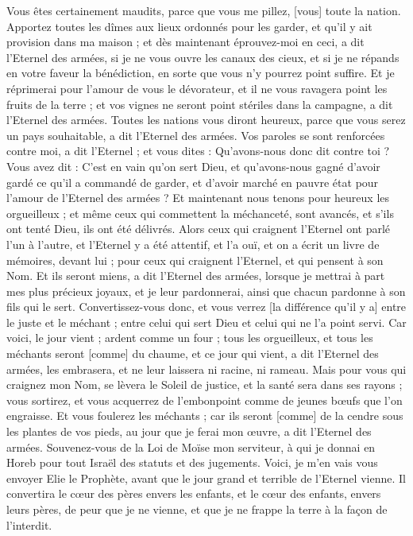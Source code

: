 \begin{multicols}{2}
Vous êtes certainement maudits, parce que vous me pillez, [vous] toute la nation.
Apportez toutes les dîmes aux lieux ordonnés pour les garder, et qu'il y ait provision dans ma maison ; et dès maintenant éprouvez-moi en ceci, a dit l'Eternel des armées, si je ne vous ouvre les canaux des cieux, et si je ne répands en votre faveur la bénédiction, en sorte que vous n'y pourrez point suffire.
Et je réprimerai pour l'amour de vous le dévorateur, et il ne vous ravagera point les fruits de la terre ; et vos vignes ne seront point stériles dans la campagne, a dit l'Eternel des armées.
Toutes les nations vous diront heureux, parce que vous serez un pays souhaitable, a dit l'Eternel des armées.
Vos paroles se sont renforcées contre moi, a dit l'Eternel ; et vous dites : Qu'avons-nous donc dit contre toi ?
Vous avez dit : C'est en vain qu'on sert Dieu, et qu'avons-nous gagné d'avoir gardé ce qu'il a commandé de garder, et d'avoir marché en pauvre état pour l'amour de l'Eternel des armées ?
Et maintenant nous tenons pour heureux les orgueilleux ; et même ceux qui commettent la méchanceté, sont avancés, et s'ils ont tenté Dieu, ils ont été délivrés.
Alors ceux qui craignent l'Eternel ont parlé l'un à l’autre, et l'Eternel y a été attentif, et l'a ouï, et on a écrit un livre de mémoires, devant lui ; pour ceux qui craignent l'Eternel, et qui pensent à son Nom.
Et ils seront miens, a dit l'Eternel des armées, lorsque je mettrai à part mes plus précieux joyaux, et je leur pardonnerai, ainsi que chacun pardonne à son fils qui le sert.
Convertissez-vous donc, et vous verrez [la différence qu'il y a] entre le juste et le méchant ; entre celui qui sert Dieu et celui qui ne l'a point servi.
\VerseOne{}Car voici, le jour vient ; ardent comme un four ; tous les orgueilleux, et tous les méchants seront [comme] du chaume, et ce jour qui vient, a dit l'Eternel des armées, les embrasera, et ne leur laissera ni racine, ni rameau.
Mais pour vous qui craignez mon Nom, se lèvera le Soleil de justice, et la santé sera dans ses rayons ; vous sortirez, et vous acquerrez de l'embonpoint comme de jeunes bœufs que l'on engraisse.
Et vous foulerez les méchants ; car ils seront [comme] de la cendre sous les plantes de vos pieds, au jour que je ferai mon œuvre, a dit l'Eternel des armées.
Souvenez-vous de la Loi de Moïse mon serviteur, à qui je donnai en Horeb pour tout Israël des statuts et des jugements.
Voici, je m'en vais vous envoyer Elie le Prophète, avant que le jour grand et terrible de l'Eternel vienne.
Il convertira le cœur des pères envers les enfants, et le cœur des enfants, envers leurs pères, de peur que je ne vienne, et que je ne frappe la terre à la façon de l'interdit.
\PPE{}
\end{multicols}
